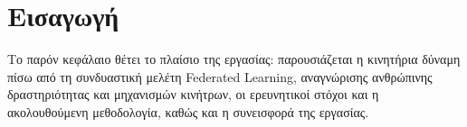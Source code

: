 
\chapter{Εισαγωγή}
\label{ch:introduction}

Το παρόν κεφάλαιο θέτει το πλαίσιο της εργασίας: παρουσιάζεται η κινητήρια δύναμη πίσω από τη συνδυαστική μελέτη Federated Learning, αναγνώρισης ανθρώπινης δραστηριότητας και μηχανισμών κινήτρων, οι ερευνητικοί στόχοι και η ακολουθούμενη μεθοδολογία, καθώς και η συνεισφορά της εργασίας.








